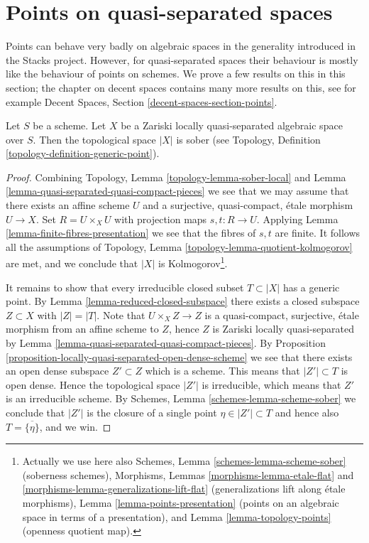 \section{Points on quasi-separated spaces}
\label{section-points-quasi-separated}

\noindent
Points can behave very badly on algebraic spaces in the generality introduced
in the Stacks project. However, for quasi-separated spaces their behaviour
is mostly like the behaviour of points on schemes. We prove a few results
on this in this section; the chapter on decent spaces contains many more
results on this, see for example
Decent Spaces, Section \ref{decent-spaces-section-points}.

\begin{lemma}
\label{lemma-quasi-separated-sober}
Let $S$ be a scheme. Let $X$ be a Zariski locally quasi-separated
algebraic space over $S$. Then the topological space $|X|$ is sober (see
Topology, Definition \ref{topology-definition-generic-point}).
\end{lemma}

\begin{proof}
Combining
Topology, Lemma \ref{topology-lemma-sober-local}
and
Lemma \ref{lemma-quasi-separated-quasi-compact-pieces}
we see that we may assume that there exists an affine scheme $U$
and a surjective, quasi-compact, \'etale morphism $U \to X$.
Set $R = U \times_X U$ with projection maps $s, t : R \to U$. Applying
Lemma \ref{lemma-finite-fibres-presentation}
we see that the fibres of $s, t$ are finite. It follows all the assumptions of
Topology, Lemma \ref{topology-lemma-quotient-kolmogorov}
are met, and we conclude that $|X|$ is Kolmogorov\footnote{
Actually we use here also
Schemes, Lemma \ref{schemes-lemma-scheme-sober} (soberness schemes),
Morphisms, Lemmas \ref{morphisms-lemma-etale-flat}
and \ref{morphisms-lemma-generalizations-lift-flat} (generalizations
lift along \'etale morphisms),
Lemma \ref{lemma-points-presentation} (points on an algebraic space in
terms of a presentation), and
Lemma \ref{lemma-topology-points} (openness quotient map).}.

\medskip\noindent
It remains to show that every irreducible closed subset
$T \subset |X|$ has a generic point. By
Lemma \ref{lemma-reduced-closed-subspace}
there exists a closed subspace $Z \subset X$ with $|Z| = |T|$.
Note that $U \times_X Z \to Z$ is a quasi-compact, surjective, \'etale
morphism from an affine scheme to $Z$, hence $Z$ is Zariski locally
quasi-separated by
Lemma \ref{lemma-quasi-separated-quasi-compact-pieces}.
By
Proposition \ref{proposition-locally-quasi-separated-open-dense-scheme}
we see that there exists an open dense subspace $Z' \subset Z$
which is a scheme. This means that $|Z'| \subset T$ is open dense.
Hence the topological space $|Z'|$ is irreducible, which means that
$Z'$ is an irreducible scheme. By
Schemes, Lemma \ref{schemes-lemma-scheme-sober}
we conclude that $|Z'|$ is the closure of a single point
$\eta \in |Z'| \subset T$ and hence also $T = \overline{\{\eta\}}$, and we win.
\end{proof}

